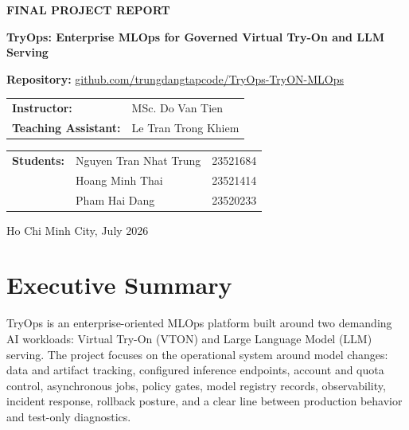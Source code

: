 \documentclass[12pt,a4paper,oneside]{report}
\newcommand{\reporttitle}{TryOps: Enterprise MLOps for Governed Virtual Try-On and LLM Serving}
\begin{document}
\begin{titlepage}
  \vspace{0.72cm}
  {\bfseries\large FINAL PROJECT REPORT\par}
  \vspace{0.28cm}
  \begin{minipage}{0.84\textwidth}
    \centering
    {\bfseries\Large\color{TryOpsNavy}\reporttitle\par}
  \end{minipage}
  \vspace{0.26cm}

  {\normalsize\textbf{Repository:} \href{https://github.com/trungdangtapcode/TryOps-TryON-MLOps}{github.com/trungdangtapcode/TryOps-TryON-MLOps}\par}

  \vspace{0.58cm}
  \begin{tabular}{>{\bfseries}p{4.2cm}p{7.2cm}}
    Instructor: & MSc. Do Van Tien \\
    Teaching Assistant: & Le Tran Trong Khiem \\
  \end{tabular}

  \vspace{0.58cm}
  \begin{tabular}{>{\bfseries}p{2.1cm}p{6.4cm}p{2.9cm}}
    Students: & Nguyen Tran Nhat Trung & 23521684 \\
              & Hoang Minh Thai & 23521414 \\
              & Pham Hai Dang & 23520233 \\
  \end{tabular}

  \vfill
  {\large Ho Chi Minh City, July 2026\par}
\end{titlepage}


\chapter*{Executive Summary}

TryOps is an enterprise-oriented MLOps platform built around two demanding AI workloads: Virtual Try-On (VTON) and Large Language Model (LLM) serving. The project focuses on the operational system around model changes: data and artifact tracking, configured inference endpoints, account and quota control, asynchronous jobs, policy gates, model registry records, observability, incident response, rollback posture, and a clear line between production behavior and test-only diagnostics.
\end{document}
